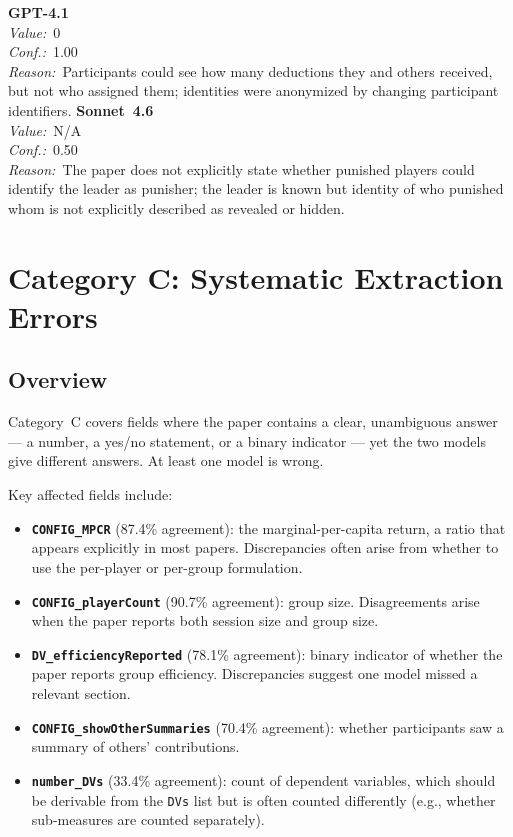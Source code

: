 \documentclass[11pt,a4paper]{article}
\begin{document}
\begin{tcolorbox}[
  title={\textbf{CONFIG\_showPunishmentId} \textbar{} DOI: 10.1093\_sf\_soy017 \textbar{} Cond.~2},
  colback=blue!3!white,
  colframe=blue!45!black,
  fonttitle=\small\sffamily,
  sidebyside,
  sidebyside align=top seam,
  lower separated=false,
  breakable,
  before upper={\small},
  before lower={\small},
]
\textbf{GPT-4.1}\\[2pt]
\textit{Value:}~0\\[3pt]
\textit{Conf.:}~1.00\\[3pt]
\textit{Reason:}~Participants could see how many deductions they and others received, but not who assigned them; identities were anonymized by changing participant identifiers.
\tcblower
\textbf{Sonnet~4.6}\\[2pt]
\textit{Value:}~N/A\\[3pt]
\textit{Conf.:}~0.50\\[3pt]
\textit{Reason:}~The paper does not explicitly state whether punished players could identify the leader as punisher; the leader is known but identity of who punished whom is not explicitly described as revealed or hidden.
\end{tcolorbox}



        \section{Category C: Systematic Extraction Errors}

        \subsection{Overview}
        Category~C covers fields where the paper contains a clear, unambiguous
answer --- a number, a yes/no statement, or a binary indicator --- yet the
two models give different answers.  At least one model is wrong.

Key affected fields include:
\begin{itemize}
  \item \textbf{\texttt{CONFIG\_MPCR}} (87.4\% agreement): the
    marginal-per-capita return, a ratio that appears explicitly in most
    papers.  Discrepancies often arise from whether to use the per-player
    or per-group formulation.
  \item \textbf{\texttt{CONFIG\_playerCount}} (90.7\% agreement):
    group size.  Disagreements arise when the paper reports both session
    size and group size.
  \item \textbf{\texttt{DV\_efficiencyReported}} (78.1\% agreement):
    binary indicator of whether the paper reports group efficiency.
    Discrepancies suggest one model missed a relevant section.
  \item \textbf{\texttt{CONFIG\_showOtherSummaries}} (70.4\% agreement):
    whether participants saw a summary of others' contributions.
  \item \textbf{\texttt{number\_DVs}} (33.4\% agreement): count of
    dependent variables, which should be derivable from the \texttt{DVs}
    list but is often counted differently (e.g., whether sub-measures are
    counted separately).
\end{itemize}
\end{document}
